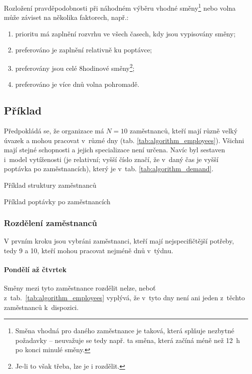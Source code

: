 \documentclass[twoside]{ctuthesis}
\begin{document}
Rozložení pravděpodobnosti při náhodném výběru vhodné směny\footnote{Směna vhodná pro daného zaměstnance je taková, která splňuje nezbytné požadavky -- neuvažuje se tedy např. ta směna, která začíná méně než 12~h po konci minulé směny.} nebo volna může záviset na několika faktorech, např.:
\begin{enumerate}
	\item prioritu má zaplnění rozvrhu ve všech časech, kdy jsou vypisovány směny;
	\item preferováno je zaplnění relativně ku poptávce;
	\item preferovány jsou celé 8hodinové směny\footnote{Je-li to však třeba, lze je i rozdělit.};
	\item preferováno je více dnů volna pohromadě.
\end{enumerate}


\subsection{Příklad}
Předpokládá se, že organizace má $N = 10$ zaměstnanců, kteří mají různě velký úvazek a mohou pracovat v~různé dny (tab. \ref{tab:algorithm_employees}). Všichni mají stejné schopnosti a jejich specializace není určena. Navíc byl sestaven i~model vytíženosti (je relativní; vyšší číslo značí, že v~daný čas je vyšší poptávka po zaměstnancích), který je v~tab. \ref{tab:algorithm_demand}.

\begin{table}[h]
	
	\caption{Příklad struktury zaměstnanců}
	\label{tab:algorithm_employees}
\end{table}

\begin{table}[h]
	
	\caption{Příklad poptávky po zaměstnancích}
	\label{tab:algorithm_demand}
\end{table}

\subsubsection{Rozdělení zaměstnanců}
V prvním kroku jsou vybráni zaměstnanci, kteří mají nejspecifičtější potřeby, tedy 9 a 10, kteří mohou pracovat nejméně dnů v~týdnu.

\paragraph{Pondělí až čtvrtek} Směny mezi tyto zaměstnance rozdělit nelze, neboť z~tab.~\ref{tab:algorithm_employees} vyplývá, že v~tyto dny není ani jeden z~těchto zaměstnanců k~dispozici.
\end{document}
